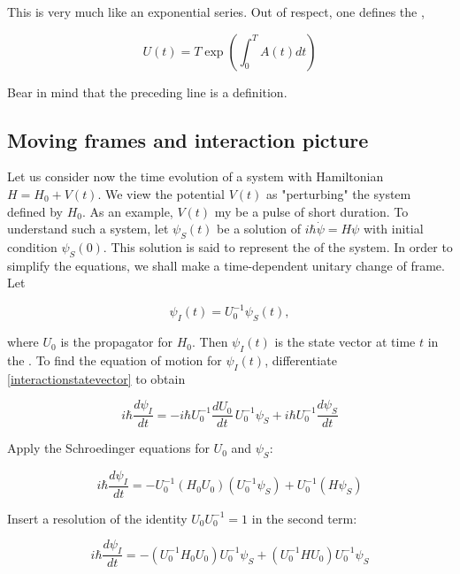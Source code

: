 This is very much like an exponential series.  Out of respect, one defines the , 

\begin{equation}
U(t) = T\exp\left( \int_0^T A(t)dt \right)
\end{equation}

Bear in mind that the preceding line is a definition.

\subsection{Moving frames and interaction picture}

Let us consider now the time evolution of a system with Hamiltonian $H = H_0 + V(t)$.  We view the potential $V(t)$ as "perturbing" the system defined by $H_0$.  As an example, $V(t)$ my be a pulse of short duration.  To understand such a system, let $\psi_S(t)$ be a solution of $i\hbar \dot \psi = H\psi$ with initial condition $\psi_S(0)$. This solution is said to represent the   of the system.  In order to simplify the equations, we shall make a time-dependent unitary change of frame. Let 

\begin{equation}
\label{interactionstatevector}
\psi_I(t) = U_0^{-1}\psi_S(t),
\end{equation}

where $U_0$ is the propagator for $H_0$.  Then $\psi_I(t)$ is the state vector at time $t$  in the .   To find the equation of motion for $\psi_I(t)$, differentiate \eqref{interactionstatevector} to obtain

\begin{equation}
i\hbar\frac{d\psi_I}{dt} = -i\hbar U_0^{-1}\frac{dU_0}{dt}\, U_0^{-1} \psi_S+ i\hbar U_0^{-1} \frac{d\psi_S}{dt}
\end{equation}

Apply the Schroedinger equations for $U_0$ and $\psi_S$:

\begin{equation}
i\hbar\frac{d\psi_I}{dt} =   -U_0^{-1}(H_0U_0) (U_0^{-1} \psi_S )+ U_0^{-1} (H\psi_S)
\end{equation}

Insert a resolution of the identity $U_0U_0^{-1} = 1$ in the second term:

\begin{equation}
i\hbar\frac{d\psi_I}{dt} =   -( U_0^{-1} H_0U_0 ) U_0^{-1} \psi_S + (U_0^{-1} HU_0 ) U_0^{-1}\psi_S
\end{equation}

